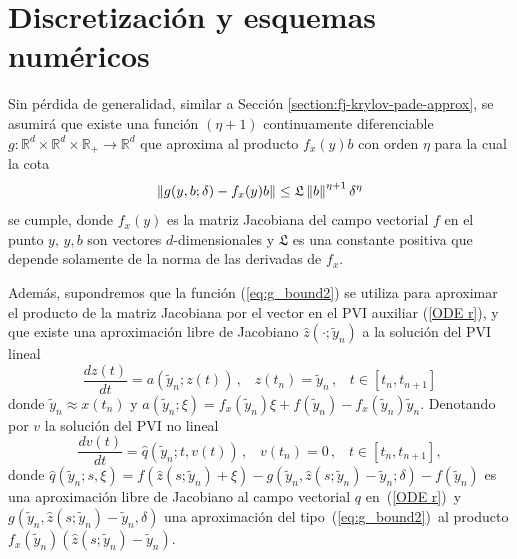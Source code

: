 \section{Discretización y esquemas numéricos}

Sin pérdida de generalidad, similar a Sección \ref{section:fj-krylov-pade-approx}, se asumirá que existe una función $(\eta+1)$ continuamente diferenciable $g: \mathbb{R}^{d}\times \mathbb{R}^{d} \times \mathbb{R}_+ \to \mathbb{R}^{d}$ que aproxima al producto $f_x(y)b$ con orden $\eta$ para la cual la cota
\begin{equation} \label{eq:g_bound2}
	\left\lVert g(y,b;\delta)-f_x(y)b \right\rVert \leq \mathfrak{L}\left\lVert b \right\rVert^{\eta+1}\delta^{\eta}
\end{equation}
se cumple, donde $f_x(y)$ es la matriz Jacobiana del campo vectorial $f$ en el punto $y$, $y,b$ son vectores $d$-dimensionales y $\mathfrak{L}$ es una constante positiva que depende solamente de la norma de las derivadas de $f_x$.

Además, supondremos que la función (\ref{eq:g_bound2}) se utiliza para aproximar el producto de la matriz Jacobiana por el vector en el PVI auxiliar (\ref{ODE r}), y que existe una aproximación libre de Jacobiano $\widehat{z}(\cdotp ;\widetilde{y}_n)$ a la solución del PVI lineal
\begin{equation}
    \frac{dz(t)}{dt} = a(\widetilde{y}_n;z(t)) \,,\;\;\; z(t_n)=\widetilde{y}_n \,,\;\;\; t\in[t_n,t_{n+1}]\label{fjsyst0}
\end{equation}
donde $\widetilde{y}_n\approx x(t_n)$ y $a(\widetilde{y}_n;\xi) = f_x(\widetilde{y}_n)\xi+f(\widetilde{y}_n)-f_x(\widetilde{y}_n)\widetilde{y}_n$. Denotando por $v$ la solución del PVI no lineal
\begin{equation}
    \frac{dv(t)}{dt} = \widehat{q}(\widetilde{y}_n;t,v(t)) \,,\;\;\; v(t_n)=0 \,,\;\;\; t\in[t_n,t_{n+1}], \label{fjsyst}
\end{equation}
donde $\widehat{q}(\widetilde{y}_n;s,\xi)=f(\widehat{z}(s;\widetilde{y}_n)+\xi)-g(\widetilde{y}_n,\widehat{z}(s;\widetilde{y}_n)-\widetilde{y}_n;\delta)-f(\widetilde{y}_n)$ es una aproximación libre de Jacobiano al campo vectorial $q$ en~(\ref{ODE r})~y $g(\widetilde{y}_n,\widehat{z}(s;\widetilde{y}_n)-\widetilde{y}_n,\delta)$ una aproximación del tipo~(\ref{eq:g_bound2})~al producto $f_x(\widetilde{y}_n)(\widehat{z}(s;\widetilde{y}_n)-\widetilde{y}_n)$.

